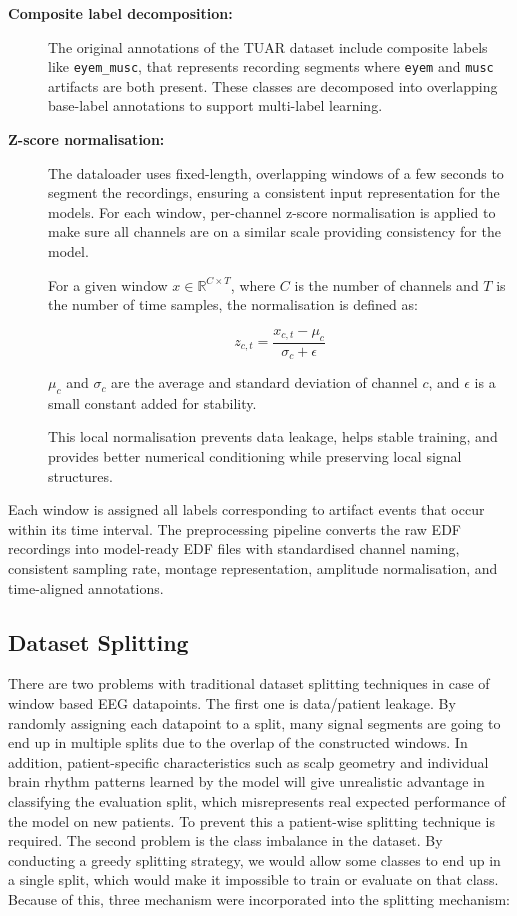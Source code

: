 \begin{description}
\item[\textbf{Composite label decomposition:}]

The original annotations of the TUAR dataset include composite labels like \texttt{eyem\_musc}, that represents recording segments where \texttt{eyem} and \texttt{musc} artifacts are both present. These classes are decomposed into overlapping base-label annotations to support multi-label learning. 

\item[\textbf{Z-score normalisation:}] The dataloader uses fixed-length, overlapping windows of a few seconds to segment the recordings, ensuring a consistent input representation for the models. For each window, per-channel z-score normalisation is applied to make sure all channels are on a similar scale providing consistency for the model. 

For a given window $x \in \mathbb{R}^{C \times T}$, where $C$ is the number of channels and $T$ is the number of time samples, the normalisation is defined as:

\[
z_{c,t} = \frac{x_{c,t} - \mu_c}{\sigma_c + \epsilon}
\]

$\mu_c$ and $\sigma_c$ are the average and standard deviation of channel $c$, and $\epsilon$ is a small constant added for stability.

This local normalisation prevents data leakage, helps stable training, and provides better numerical conditioning while preserving local signal structures.

\end{description}

 Each window is assigned all labels corresponding to artifact events that occur within its time interval. The preprocessing pipeline converts the raw EDF recordings into model-ready EDF files with standardised channel naming, consistent sampling rate, montage representation, amplitude normalisation, and time-aligned annotations.

\subsection{Dataset Splitting}

There are two problems with traditional dataset splitting techniques in case of window based EEG datapoints. The first one is data/patient leakage. By randomly assigning each datapoint to a split, many signal segments are going to end up in multiple splits due to the overlap of the constructed windows. In addition, patient-specific characteristics such as scalp geometry and individual brain rhythm patterns learned by the model will give unrealistic advantage in classifying the evaluation split, which misrepresents real expected performance of the model on new patients. To prevent this a patient-wise splitting technique is required. The second problem is the class imbalance in the dataset. By conducting a greedy splitting strategy, we would allow some classes to end up in a single split, which would make it impossible to train or evaluate on that class. Because of this, three mechanism were incorporated into the splitting mechanism:

